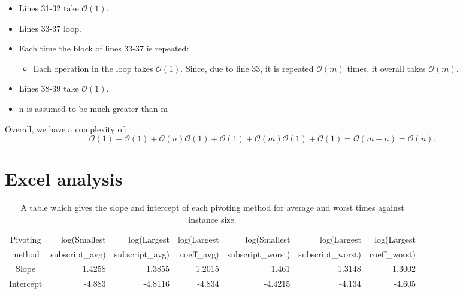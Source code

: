 \documentclass[a4paper]{article}
\numberwithin{equation}{section}
\begin{document}
\begin{itemize}
  \item Lines 31-32 take $\mathcal{O}(1)$.
  \item Lines 33-37 loop.
  \item Each time the block of lines 33-37 is repeated:
  \begin{itemize}

    \item  Each operation in the loop takes $\mathcal{O}(1)$. Since, due to line 33, it is repeated $\mathcal{O}(m)$ times, it overall takes $\mathcal{O}(m)$.
  \end{itemize}
  \item Lines 38-39 take $\mathcal{O}(1)$.
  \item n is assumed to be much greater than m
\end{itemize}

Overall, we have a complexity of:
\begin{equation}
    \label{eq:complexity_ls}
  \mathcal{O}(1) + \mathcal{O}(1) + \mathcal{O}(n) \mathcal{O}(1) + \mathcal{O}(1) + \mathcal{O}(m) \mathcal{O}(1) + \mathcal{O}(1) = \mathcal{O}(m + n)  = \mathcal{O}(n).
\end{equation}

\section{Excel analysis}
\label{sec:excel}

\begin{table}[h!]
  \caption{A table which gives the slope and intercept of each pivoting method for average and worst times against instance size.}
  \begin{center}
    \setlength{\tabcolsep}{6pt}
    \begin{tabular}{c|rrrrrr}
      Pivoting & log(Smallest & log(Largest & log(Largest & log(Smallest & log(Largest & log(Largest \\
      method & subscript\_avg) & subscript\_avg) & coeff\_avg) & subscript\_worst) & subscript\_worst) & coeff\_worst) \\
      \hline
      Slope & 1.4258 & 1.3855 & 1.2015 & 1.461 & 1.3148 & 1.3002 \\
      Intercept & -4.883 & -4.8116 & -4.834 & -4.4215 & -4.134 & -4.605 \\
    \end{tabular}
  \end{center}
\label{tab:1}
\end{table}
\end{document}
